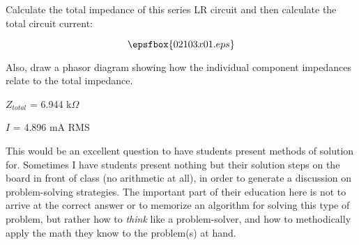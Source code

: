

Calculate the total impedance of this series LR circuit and then calculate the total circuit current:

$$\epsfbox{02103x01.eps}$$

Also, draw a phasor diagram showing how the individual component impedances relate to the total impedance.







$Z_{total}$ = 6.944 k$\Omega$

$I$ = 4.896 mA RMS







This would be an excellent question to have students present methods of solution for.  Sometimes I have students present nothing but their solution steps on the board in front of class (no arithmetic at all), in order to generate a discussion on problem-solving strategies.  The important part of their education here is not to arrive at the correct answer or to memorize an algorithm for solving this type of problem, but rather how to {\it think} like a problem-solver, and how to methodically apply the math they know to the problem(s) at hand.




